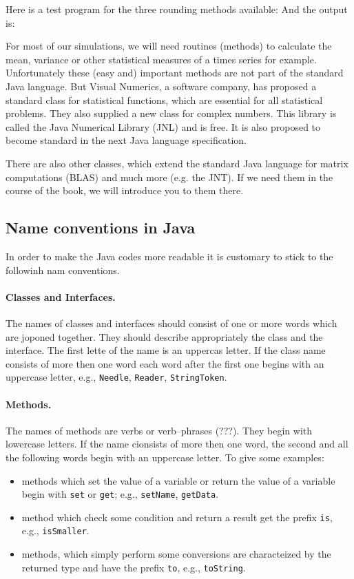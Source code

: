 Here is a test program for the three rounding methods available:
And the output is:


For most of our simulations, we will need routines (methods) to
calculate the mean, variance or other statistical measures of
a times series for example. Unfortunately
these (easy and) important methods are not part of the
standard Java language. But Visual Numerics, a software company,
has proposed a standard class for statistical functions, which are
essential for all statistical problems. They also supplied a new class
for complex numbers. This library is called the Java Numerical Library
(JNL) and is free. It is also proposed to become standard in the
next Java language specification.

There are also other classes, which extend the standard Java language
for matrix computations (BLAS) and much more (e.g. the JNT). If we need
them in the course of the book, we will introduce you to them there.

\subsection{Name conventions in Java}
In order to make the Java codes more readable it is customary to stick
to the followinh nam conventions.

\paragraph{Classes and Interfaces.} The names of classes and interfaces
  should consist of one or more words which are joponed together. They
  should describe appropriately the class and the interface. 
The first lette of the name is an uppercas letter. If the
  class name consists of more then one word each word after the first
  one begins with an uppercase letter, e.g., \verb|Needle|,
  \verb|Reader|, \verb|StringToken|.

\paragraph{Methods.} The names of methods are verbs or verb--phrases
  (???). They begin with lowercase letters. If the name cionsists of
  more then one word, the second and all the following words begin
  with an uppercase letter. To give some examples:
\begin{itemize}
\item methods which set the value of a variable or return the value of
  a variable begin with \verb|set| or \verb|get|; e.g.,
  \verb|setName|, \verb|getData|.
\item method which check some condition and return a result  get the
  prefix \verb|is|, e.g., \verb|isSmaller|.
\item methods, which simply perform some conversions are characteized
  by the returned type and have the prefix \verb|to|, e.g.,
  \verb|toString|.
\end{itemize}

